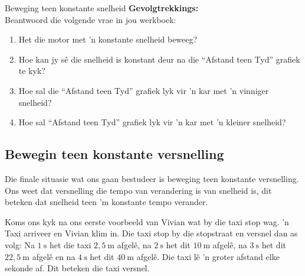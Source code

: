 \begin{g_experiment}{Beweging teen konstante snelheid}
\textbf{Gevolgtrekkings:}\\
Beantwoord die volgende vrae in jou werkboek:
\begin{enumerate}[noitemsep, label=\textbf{\arabic*}. ] 
    \item Het die motor met  'n konstante snelheid beweeg?
    \item Hoe kan jy s\^e die snelheid is konstant deur na die ``Afstand teen Tyd'' grafiek te kyk?
    \item Hoe sal die ``Afstand teen Tyd'' grafiek lyk vir  'n kar met  'n vinniger snelheid?
    \item Hoe sal ``Afstand teen Tyd'' grafiek lyk vir  'n kar met  'n kleiner snelheid?
\end{enumerate}
\end{g_experiment}
        \par 


\subsection*{Bewegin teen konstante versnelling}
            \nopagebreak
Die finale situasie wat ons gaan bestudeer is beweging teen konstante versnelling. Ons weet dat versnelling die tempo van verandering is van snelheid is, dit beteken dat snelheid teen 'm konstante tempo verander.\par 
        
Koms ons kyk na ons eerste voorbeeld van Vivian wat by die taxi stop wag.  'n Taxi arriveer en Vivian klim in. Die taxi stop by die stopstraat en versnel dan as volg: Na $1~\text{s}$ het die taxi $2,5~\text{m}$ afgel\^e, na $2~\text{s}$ het dit $10~\text{m}$ afgel\^e, na $3~\text{s}$ het dit $22,5~\text{m}$ afgel\^e en na $4~\text{s}$ het dit $40~\text{m}$ afgel\^e. Die taxi l\^e  'n groter afstand elke sekonde af. Dit beteken die taxi versnel.\par 

